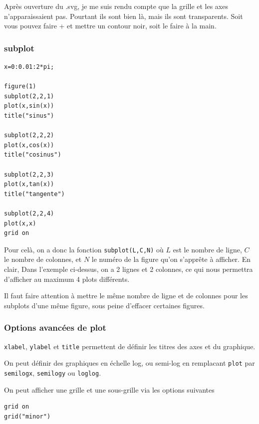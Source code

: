 \documentclass[a4paper,twoside]{article}
\begin{document}
\begin{remarque}
Après ouverture du .svg, je me suis rendu compte que la grille et les axes n'apparaissaient pas. Pourtant ils sont bien là, mais ils sont transparents. Soit vous pouvez faire + et mettre un contour noir, soit le faire à la main.
\end{remarque}

\subsubsection{subplot}
\begin{verbatim}
x=0:0.01:2*pi;

figure(1)
subplot(2,2,1)
plot(x,sin(x))
title("sinus")

subplot(2,2,2)
plot(x,cos(x))
title("cosinus")

subplot(2,2,3)
plot(x,tan(x))
title("tangente")

subplot(2,2,4)
plot(x,x)
grid on
\end{verbatim}

Pour celà, on a donc la fonction \verb|subplot(L,C,N)| où $L$ est le nombre de ligne, $C$ le nombre de colonnes, et $N$ le numéro de la figure qu'on s'apprête à afficher. En clair, Dans l'exemple ci-dessus, on a 2 lignes et 2 colonnes, ce qui nous permettra d'afficher au maximum 4 plots différents.

\begin{attention}
Il faut faire attention à mettre le même nombre de ligne et de colonnes pour les subplots d'une même figure, sous peine d'effacer certaines figures.
\end{attention}

\subsubsection{Options avancées de plot}
\texttt{xlabel}, \texttt{ylabel} et \texttt{title} permettent de définir les titres des axes et du graphique.

On peut définir des graphiques en échelle log, ou semi-log en remplacant \texttt{plot} par \texttt{semilogx}, \texttt{semilogy} ou \texttt{loglog}.

On peut afficher une grille et une sous-grille via les options suivantes
\begin{verbatim}
grid on
grid("minor")
\end{verbatim}
\end{document}
